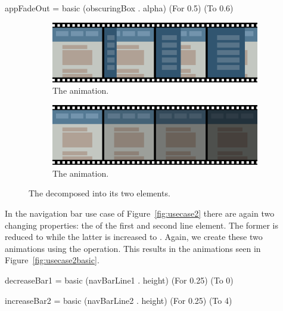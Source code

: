 \begin{spec}
appFadeOut = basic (obscuringBox . alpha) (For 0.5) (To 0.6)
\end{spec}

\begin{figure}[h]
\centering

\begin{subfigure}[h]{\textwidth}
\centering
\includegraphics[width=\figscale\textwidth]{pictures/usecase1basic1}
\caption{The  animation.}
\label{fig:usecase1basic1}
\end{subfigure}

\begin{subfigure}[h]{\textwidth}
\centering
\includegraphics[width=\figscale\textwidth]{pictures/usecase1basic2}
\caption{The  animation.}
\label{fig:usecase1basic2}
\end{subfigure}

\caption{The  decomposed into its two elements.}
\label{fig:usecase1basic}
\end{figure}

In the navigation bar use case of Figure~\ref{fig:usecase2} there are again two changing properties: the  of the first and second line element. The former is reduced to  while the latter is increased to . Again, we create these two animations using the  operation. This results in the animations seen in Figure~\ref{fig:usecase2basic}.

\begin{spec}
decreaseBar1 = basic (navBarLine1 . height) (For 0.25) (To 0)

increaseBar2 = basic (navBarLine2 . height) (For 0.25) (To 4)
\end{spec}

